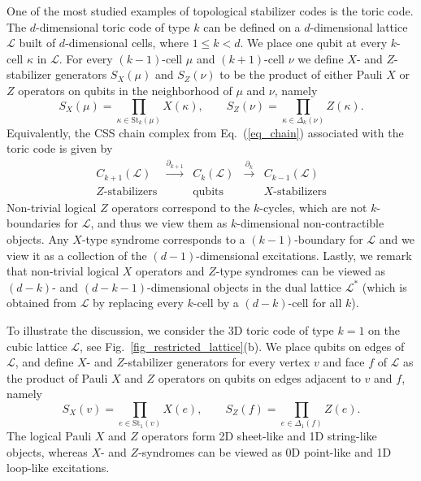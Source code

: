 \documentclass[onecolumn,letterpaper,11pt,accepted=2022-12-19]{quantumarticle}
\newcommand{\face}[2]{{\Delta_{#1}(#2)}}
\renewcommand{\star}[2]{{\mathrm{St}_{#1}(#2)}}
\theoremstyle{definition}
\theoremstyle{lemma}
\theoremstyle{theorem}
\theoremstyle{corollary}
\begin{document}
One of the most studied examples of topological stabilizer codes is the toric code.
The $d$-dimensional toric code of type $k$ can be defined on a $d$-dimensional lattice $\mathcal{L}$ built of $d$-dimensional cells, where $1\leq k < d$.
We place one qubit at every $k$-cell $\kappa$ in $\mathcal{L}$.
For every $(k-1)$-cell $\mu$ and $(k+1)$-cell $\nu$ we define $X$- and $Z$-stabilizer generators $S_X(\mu)$ and $S_Z(\nu)$ to be the product of either Pauli $X$ or $Z$ operators on qubits in the neighborhood of $\mu$ and $\nu$, namely 
\begin{equation}
S_X(\mu) = \prod_{\kappa\in\star{k}{\mu}} X(\kappa),\quad\quad
S_Z(\nu) = \prod_{\kappa\in\face{k}{\nu}} Z(\kappa).
\end{equation}
Equivalently, the CSS chain complex from Eq.~(\ref{eq_chain}) associated with the toric code is given by
\begin{equation} 
\begin{array}{ccccc}
C_{k+1}(\mathcal{L}) & \xrightarrow{\partial_{k+1}} & C_{k}(\mathcal{L}) & \xrightarrow{\partial_k} & C_{k-1}(\mathcal{L})\\
Z\textrm{-stabilizers} & & \mathrm{qubits} & & X\textrm{-stabilizers}
\end{array}
\label{eq_chain_tc}
\end{equation}
Non-trivial logical $Z$ operators correspond to the $k$-cycles, which are not $k$-boundaries for $\mathcal{L}$, and thus we view them as $k$-dimensional non-contractible objects.
Any $X$-type syndrome corresponds to a $(k-1)$-boundary for $\mathcal{L}$ and we view it as a collection of the $(d-1)$-dimensional excitations.
Lastly, we remark that non-trivial logical $X$ operators and $Z$-type syndromes can be viewed as $(d-k)$- and $(d-k-1)$-dimensional objects in the dual lattice $\mathcal{L}^*$ (which is obtained from $\mathcal{L}$ by replacing every $k$-cell by a $(d-k)$-cell for all $k$).


To illustrate the discussion, we consider the 3D toric code of type $k=1$ on the cubic lattice $\mathcal{L}$, see Fig.~\ref{fig_restricted_lattice}(b).
We place qubits on edges of $\mathcal{L}$, and define $X$- and $Z$-stabilizer generators for every vertex $v$ and face $f$ of $\mathcal{L}$ as the product of Pauli $X$ and $Z$ operators on qubits on edges adjacent to $v$ and $f$, namely
\begin{equation}
S_X(v) = \prod_{e\in\star{1}{v}} X(e),\quad\quad
S_Z(f) = \prod_{e\in\face{1}{f}} Z(e).
\end{equation}
The logical Pauli $X$ and $Z$ operators form 2D sheet-like and 1D string-like objects, whereas $X$- and $Z$-syndromes can be viewed as 0D point-like and 1D loop-like excitations.
\end{document}
